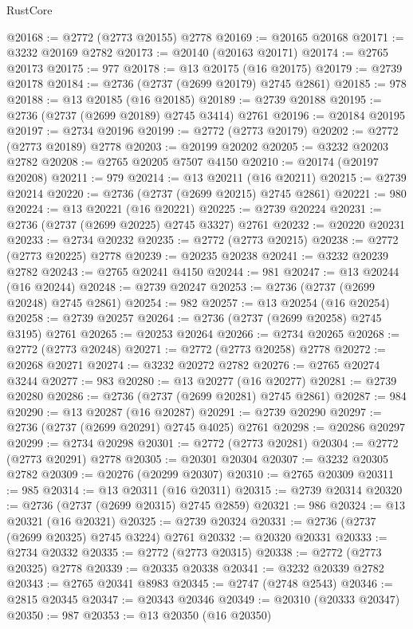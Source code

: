 \begin{lexlean}{RustCore}
\begin{coremodule}
@20168 := @2772 (@2773 @20155) @2778
@20169 := @20165 @20168
@20171 := @3232 @20169 @2782
@20173 := @20140 (@20163 @20171)
@20174 := @2765 @20173
@20175 := 977
@20178 := @13 @20175 (@16 @20175)
@20179 := @2739 @20178
@20184 := @2736 (@2737 (@2699 @20179) @2745 @2861)
@20185 := 978
@20188 := @13 @20185 (@16 @20185)
@20189 := @2739 @20188
@20195 := @2736 (@2737 (@2699 @20189) @2745 @3414) @2761
@20196 := @20184 @20195
@20197 := @2734 @20196
@20199 := @2772 (@2773 @20179)
@20202 := @2772 (@2773 @20189) @2778
@20203 := @20199 @20202
@20205 := @3232 @20203 @2782
@20208 := @2765 @20205 @7507 @4150
@20210 := @20174 (@20197 @20208)
@20211 := 979
@20214 := @13 @20211 (@16 @20211)
@20215 := @2739 @20214
@20220 := @2736 (@2737 (@2699 @20215) @2745 @2861)
@20221 := 980
@20224 := @13 @20221 (@16 @20221)
@20225 := @2739 @20224
@20231 := @2736 (@2737 (@2699 @20225) @2745 @3327) @2761
@20232 := @20220 @20231
@20233 := @2734 @20232
@20235 := @2772 (@2773 @20215)
@20238 := @2772 (@2773 @20225) @2778
@20239 := @20235 @20238
@20241 := @3232 @20239 @2782
@20243 := @2765 @20241 @4150
@20244 := 981
@20247 := @13 @20244 (@16 @20244)
@20248 := @2739 @20247
@20253 := @2736 (@2737 (@2699 @20248) @2745 @2861)
@20254 := 982
@20257 := @13 @20254 (@16 @20254)
@20258 := @2739 @20257
@20264 := @2736 (@2737 (@2699 @20258) @2745 @3195) @2761
@20265 := @20253 @20264
@20266 := @2734 @20265
@20268 := @2772 (@2773 @20248)
@20271 := @2772 (@2773 @20258) @2778
@20272 := @20268 @20271
@20274 := @3232 @20272 @2782
@20276 := @2765 @20274 @3244
@20277 := 983
@20280 := @13 @20277 (@16 @20277)
@20281 := @2739 @20280
@20286 := @2736 (@2737 (@2699 @20281) @2745 @2861)
@20287 := 984
@20290 := @13 @20287 (@16 @20287)
@20291 := @2739 @20290
@20297 := @2736 (@2737 (@2699 @20291) @2745 @4025) @2761
@20298 := @20286 @20297
@20299 := @2734 @20298
@20301 := @2772 (@2773 @20281)
@20304 := @2772 (@2773 @20291) @2778
@20305 := @20301 @20304
@20307 := @3232 @20305 @2782
@20309 := @20276 (@20299 @20307)
@20310 := @2765 @20309
@20311 := 985
@20314 := @13 @20311 (@16 @20311)
@20315 := @2739 @20314
@20320 := @2736 (@2737 (@2699 @20315) @2745 @2859)
@20321 := 986
@20324 := @13 @20321 (@16 @20321)
@20325 := @2739 @20324
@20331 := @2736 (@2737 (@2699 @20325) @2745 @3224) @2761
@20332 := @20320 @20331
@20333 := @2734 @20332
@20335 := @2772 (@2773 @20315)
@20338 := @2772 (@2773 @20325) @2778
@20339 := @20335 @20338
@20341 := @3232 @20339 @2782
@20343 := @2765 @20341 @8983
@20345 := @2747 (@2748 @2543)
@20346 := @2815 @20345
@20347 := @20343 @20346
@20349 := @20310 (@20333 @20347)
@20350 := 987
@20353 := @13 @20350 (@16 @20350)

\end{coremodule}
\end{lexlean}
